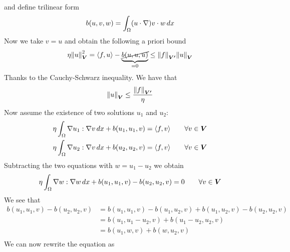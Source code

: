 \begin{enumerate}
\[\begin{split}
              \end{split}
          \]
          and define trilinear form
          \[
              \begin{split}
                  b(u, v, w) = \int_\Omega (u \cdot \nabla) v \cdot w \, dx
              \end{split}
          \]
          Now we take \(v = u\) and obtain the following a priori bound
          \[
              \begin{split}
                  \eta \norm{u}_{\bm{V}}^2 = \langle f, u \rangle - \underbrace{\cancel{b(u, u, u)}}_{=0} \leq \norm{f}_{\bm{V'}} \norm{u}_{\bm{V}}
              \end{split}
          \]
          Thanks to the Cauchy-Schwarz inequality. We have that
          \[
              \begin{split}
                  \norm{u}_{\bm{V}} \leq \frac{\norm{f}_{\bm{V'}}}{\eta}
              \end{split}
          \]
          Now assume the existence of two solutions \(u_1\) and \(u_2\):
          \begin{align*}
              \eta \int_\Omega \nabla u_1 : \nabla v \, dx + b(u_1, u_1, v) & = \langle f, v \rangle \qquad \forall v \in \bm{V} \\
              \eta \int_\Omega \nabla u_2 : \nabla v \, dx + b(u_2, u_2, v) & = \langle f, v \rangle \qquad \forall v \in \bm{V}
          \end{align*}
          Subtracting the two equations with \(w = u_1 - u_2\) we obtain
          \[
              \begin{split}
                  \eta \int_\Omega \nabla w : \nabla w \, dx + b(u_1, u_1, v) - b(u_2, u_2, v) = 0 \qquad \forall v \in \bm{V}
              \end{split}
          \]
          We see that
          \begin{align*}
              b(u_1, u_1, v) - b(u_2, u_2, v) & = b(u_1, u_1, v) - b(u_1, u_2, v) + b(u_1, u_2, v) - b(u_2, u_2, v) \\
                                              & = b(u_1, u_1 - u_2, v) + b(u_1 - u_2, u_2, v)                       \\
                                              & = b(u_1, w, v) + b(w, u_2, v)                                       \\
          \end{align*}
          We can now rewrite the equation as
          \[
              \begin{split}

\end{split}\]
\end{enumerate}
